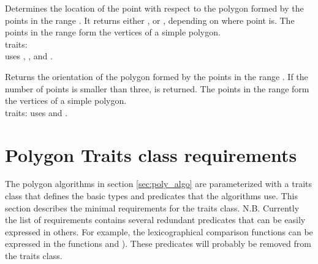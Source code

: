 {
Determines the location of the point  with respect to the polygon
formed by the points in the range \ccStyle{[first,last)}.
It returns either , 
or , depending on where point  is.
\ccPrecond The points in the range \ccStyle{[first,last)}
form the vertices of a simple polygon.\\
{\sc traits}: \\ uses ,
                   ,
                    and
                   .
}

{\samepage
{}
{
Returns the orientation of the polygon formed by the points in the range
\ccStyle{[first,last)}. 
If the number of points is smaller than three,  is
returned.
\ccPrecond The points in the range \ccStyle{[first,last)}
form the vertices of a simple polygon.\\
{\sc traits}: uses  and .
}
}

\section{Polygon Traits class requirements}

The polygon algorithms in section \ref{sec:poly_algo} are parameterized with
a traits class  that defines the basic types and predicates
that the algorithms use. This section describes the minimal requirements for
the traits class. N.B. Currently the list of requirements contains several
redundant predicates that can be easily expressed in others. For example,
the lexicographical comparison functions can be expressed in the functions
 and ). These predicates will probably
be removed from the traits class.

